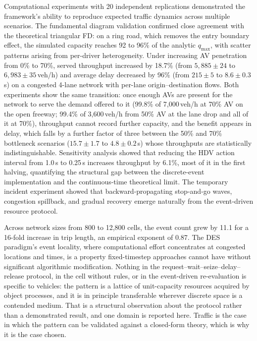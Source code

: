 \documentclass[review,number]{elsarticle}
\begin{document}
Computational experiments with 20 independent replications demonstrated the framework's ability to reproduce expected traffic dynamics across multiple scenarios. The fundamental diagram validation confirmed close agreement with the theoretical triangular FD: on a ring road, which removes the entry boundary effect, the simulated capacity reaches 92 to 96\% of the analytic $q_{\max}$, with scatter patterns arising from per-driver heterogeneity. Under increasing AV penetration from 0\% to 70\%, served throughput increased by 18.7\% (from $5{,}885 \pm 24$ to $6{,}983 \pm 35$\,veh/h) and average delay decreased by 96\% (from $215 \pm 5$ to $8.6 \pm 0.3$\,s) on a congested 4-lane network with per-lane origin--destination flows. Both experiments show the same transition: once enough AVs are present for the network to serve the demand offered to it (99.8\% of 7{,}000\,veh/h at 70\% AV on the open freeway; 99.4\% of 3{,}600\,veh/h from 50\% AV at the lane drop and all of it at 70\%), throughput cannot record further capacity, and the benefit appears in delay, which falls by a further factor of three between the 50\% and 70\% bottleneck scenarios ($15.7 \pm 1.7$ to $4.8 \pm 0.2$\,s) whose throughputs are statistically indistinguishable. Sensitivity analysis showed that reducing the HDV action interval from 1.0\,s to 0.25\,s increases throughput by 6.1\%, most of it in the first halving, quantifying the structural gap between the discrete-event implementation and the continuous-time theoretical limit. The temporary incident experiment showed that backward-propagating stop-and-go waves, congestion spillback, and gradual recovery emerge naturally from the event-driven resource protocol.

Across network sizes from 800 to 12{,}800 cells, the event count grew by 11.1 for a 16-fold increase in trip length, an empirical exponent of 0.87. The DES paradigm's event locality, where computational effort concentrates at congested locations and times, is a property fixed-timestep approaches cannot have without significant algorithmic modification. Nothing in the request--wait--seize--delay--release protocol, in the cell without rules, or in the event-driven re-evaluation is specific to vehicles: the pattern is a lattice of unit-capacity resources acquired by object processes, and it is in principle transferable wherever discrete space is a contended medium. That is a structural observation about the protocol rather than a demonstrated result, and one domain is reported here. Traffic is the case in which the pattern can be validated against a closed-form theory, which is why it is the case chosen.
\end{document}
